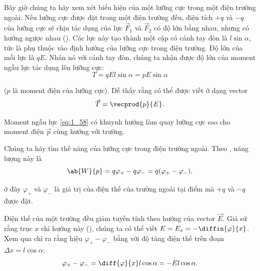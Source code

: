 Bây giờ chúng ta hãy xem xét biểu hiện của một lưỡng cực trong một điện trường ngoài. Nếu lưỡng cực được đặt trong một điện trường đều, điện tích $+q$ và $-q$ của lưỡng cực sẽ chịu tác dụng của lực $\vec{F}_1$ và $\vec{F}_2$ có độ lớn bằng nhau, nhưng có hướng ngược nhau (). Các lực này tạo thành một cặp có cánh tay đòn là $l\sin\alpha$, tức là phụ thuộc vào định hướng của lưỡng cực trong điện trường. Độ lớn của mỗi lực là $qE$. Nhân nó với cánh tay đòn, chúng ta nhận được độ lớn của moment ngẫu lực tác dụng lên lưỡng cực:
\begin{equation}\label{eq:1_57}
	T = q E l \sin\alpha = p E \sin\alpha
\end{equation}

\noindent
($p$ là moment điện của lưỡng cực). Dễ thấy rằng  có thể được viết ở dạng vector
\begin{equation}\label{eq:1_58}
	\vec{T} = \vecprod{p}{E}.
\end{equation}

\noindent
Moment ngẫu lực \eqref{eq:1_58} có khuynh hướng làm quay lưỡng cực sao cho moment điện $\vec{p}$ cùng hướng với trường.

Chúng ta hãy tìm thế năng của lưỡng cực trong điện trường ngoài. Theo , năng lượng này là
\begin{equation}\label{eq:1_59}
	\ab{W}{p} = q\varphi_+ - q\varphi_- = q(\varphi_+ - \varphi_-).
\end{equation}

\noindent
ở đây $\varphi_+$ và $\varphi_-$ là giá trị của điện thế của trường ngoài tại điểm mà $+q$ và $-q$ được đặt.

Điện thế của một trường đều giảm tuyến tính theo hướng của vector $\vec{E}$. Giả sử rằng trục $x$ chỉ hướng này (), chúng ta có thể viết $E=E_x=-\diffin{\varphi}{x}$. Xem qua  chỉ ra rằng hiệu $\varphi_+-\varphi_-$ bằng với độ tăng điện thế trên đoạn $\Delta{x}=l\cos\alpha$:
\begin{equation*}
	\varphi_+ - \varphi_- = \diff{\varphi}{x} l\cos\alpha = -El\cos\alpha.
\end{equation*}

